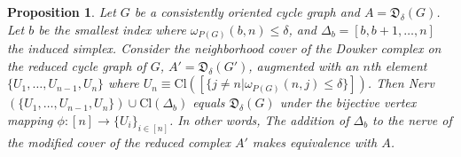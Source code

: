\documentclass[pdflatex,bst/sn-mathphys-num]{sn-jnl}%
\theoremstyle{thmstyleone}%
\newtheorem{prop}[theorem]{Proposition}%
\theoremstyle{definition}
\theoremstyle{thmstyletwo}%
\newcommand{\FD}{\mathfrak{D}}
\theoremstyle{thmstylethree}%
\begin{document}

\begin{prop}\label{prop:reduced_equiv}
    Let $G$ be a consistently oriented cycle graph and $A=\FD_\delta(G)$.
    Let $b$ be the smallest index where $\omega_{P(G)}(b,n)\leq \delta$, and $\Delta_b=[b,b+1,\dotsc,n]$ the induced simplex. Consider the neighborhood cover of the Dowker complex on the reduced cycle graph of $G$, $A'=\FD_\delta(G')$, augmented with an $n$th element $\{U_1, \dotsc, U_{n-1},U_n\}$ where $U_n\equiv \text{Cl}([\{j\neq n | \omega_{P(G)}(n,j)\leq \delta\}])$. Then Nerv$\left(\{U_1, \dotsc, U_{n-1},U_n\}\right) \cup \text{Cl}(\Delta_b)$ equals $\FD_\delta(G)$ under the bijective vertex mapping $\phi:[n]\to \{U_i\}_{i\in [n]}$. In other words, The addition of $\Delta_b$ to the nerve of the modified cover of the reduced complex $A'$ makes equivalence with $A$.
\end{prop}
\end{document}
